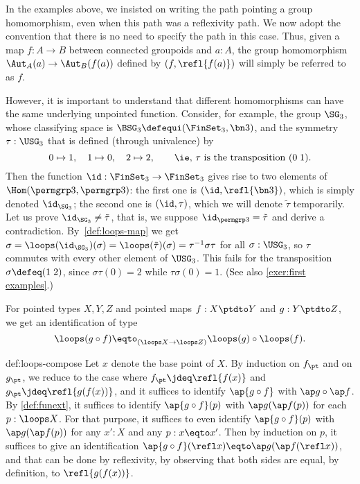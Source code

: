 \begin{remark}
  In the examples above, we insisted on writing the path pointing a group
  homomorphism, even when this path was a reflexivity path. We now adopt
  the convention that there is no need to specify the path in this case. Thus, given a
  map $f:A \to B$ between connected groupoids and $a:A$, the group
  homomorphism $\Aut_A(a) \to \Aut_B(f(a))$ defined by
  $(f,\refl{f(a)})$ will simply be referred to as $f$.

  However, it is important to understand that different homomorphisms
  can have the same underlying unpointed function. Consider, for
  example, the group $\SG_3$, whose classifying space is
  $\BSG_3\defequi (\FinSet_3,\bn 3)$, and the symmetry
  $\tau:\USG_3$ that is defined (through
  univalence) by
  \[
    0\mapsto 1,\quad 1\mapsto 0,\quad 2 \mapsto 2, \qquad
    \text{\ie, $\tau$ is the transposition $(0\; 1)$.}
  \]
  Then the function $\id: \FinSet_3 \to \FinSet_3$ gives rise to two
  elements of $\Hom(\permgrp 3,\permgrp 3)$: the first one is
  $(\id,\refl{\bn 3})$, which is simply denoted $\id_{\SG_3}$;
  the second one is $(\id,\tau)$, which we will denote $\tilde\tau$
  temporarily. Let us prove $\id_{\SG_3} \neq \tilde \tau$, that
  is, we suppose $\id_{\permgrp 3} = \tilde \tau$
  and derive a
  contradiction. By~\cref{def:loops-map} we get
  $\sigma = \loops(\id_{\SG_3})(\sigma) = \loops(\tilde \tau)(\sigma) 
          = \tau^{-1} \sigma \tau$ for all $\sigma : \USG_3$,
  so $\tau$ commutes with every other element of
  $\USG_3$. This fails for the transposition $\sigma \defeq (1\;2)$,
  since $\sigma\tau(0) = 2$ while $\tau\sigma(0) = 1$. (See also
  \cref{exer:first examples}.)
\end{remark}

\begin{construction}\label{def:loops-compose}
  For pointed types $X,Y,Z$ and pointed maps $f : X \ptdto Y$
  and $g : Y \ptdto Z$, we get an identification of type
  \[
    \loops(g \circ f) \eqto_{(\loops X \to \loops Z)}
    \loops(g) \circ \loops(f).
  \]
\end{construction}

\begin{implementation}{def:loops-compose}
  Let $x$ denote the base point of $X$.
  By induction on $f_\pt$ and on $g_\pt$, we reduce to the case where $f_\pt \jdeq \refl{f(x)}$
  and $g_\pt \jdeq \refl{g(f(x))}$, and it suffices to identify $\ap{g \circ f}$ with $\ap g \circ \ap f$.
  By \cref{def:funext}, it suffices to identify $\ap{g \circ f}(p)$ with $\ap g ( \ap f (p))$ for each $p : \loops X$.
  For that purpose, it suffices to even identify $\ap{g \circ f}(p)$ with $\ap g ( \ap f (p))$ for any $x' : X$ and any $p : x \eqto x'$.
  Then by induction on $p$, it suffices to give an identification
  $\ap{g \circ f}(\refl x) \eqto \ap g ( \ap f (\refl x))$, and that can
  be done by reflexivity,
  by observing that both sides are equal, by definition, to $\refl{g(f(x))}$.
\end{implementation}


